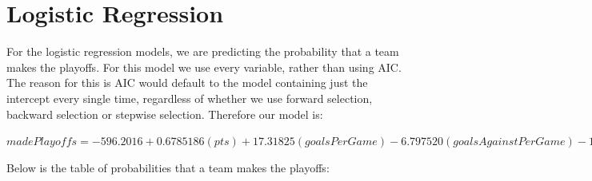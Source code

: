 \section*{Logistic Regression}
For the logistic regression models, we are predicting the probability that a team makes the playoffs. For this model we use every variable, rather than using AIC. The reason for this is AIC would default to the model containing just the intercept every single time, regardless of whether we use forward selection, backward selection or stepwise selection. Therefore our model is:\begin{center}$
	madePlayoffs = -596.2016 + 0.6785186(pts) + 17.31825(goalsPerGame) - 6.797520(goalsAgainstPerGame) - 18.07236(evGAARatio) - 0.1268944(powerPlayPercentage) - 0.03467402(powerPlayGoals) - 0.1270233(powerPlayGoalsAgainst) - 0.004215109(powerPlayOpportunities) - 0.04239098(penaltyKillPercentage) - 0.3554432(shotsPerGame) - 16.05426(winLeadFirstPer) + 3.368749(winLeadSecondPer) + 3.367920(winOutshootOpp) + 12.48498(winOutshotByOpp) + 0.07043268(faceOffsTaken) - 0.1464181(faceOffsWon) + 7.594018(faceOffWinPercentage) - 1.656188(shootingPctg) + 214.9347(savePctg)   
	$\end{center}
Below is the table of probabilities that a team makes the playoffs: \newpage
